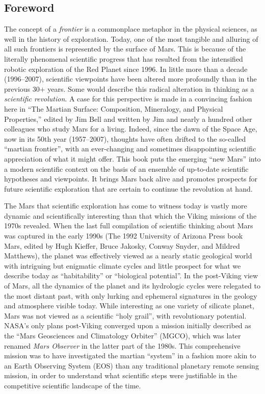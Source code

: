 \begin{foreword}
\chapter*{Foreword}

The concept of a {\it frontier} is a commonplace metaphor in the physical sciences, as well in the history of exploration. Today, one of the most tangible and alluring of all such frontiers is represented by the surface of Mars. This is because of the literally phenomenal scientific progress that has resulted from the intensified robotic exploration of the Red Planet since 1996. In little more than a decade (1996--2007), scientific viewpoints have been altered more profoundly than in the previous 30$+$ years. Some would describe this radical alteration in thinking as a {\it scientific revolution}. A case for this perspective is made in a convincing fashion here in ``The Martian Surface: Composition, Mineralogy, and Physical Properties,'' edited by Jim Bell and written by Jim and nearly a hundred other colleagues who study Mars for a living. Indeed, since the dawn of the Space Age, now in its 50th year (1957--2007), thoughts have often drifted to the so-called ``martian frontier'', with an ever-changing and sometimes disappointing scientific appreciation of what it might offer. This book puts the emerging ``new Mars'' into a modern scientific context on the basis of an ensemble of up-to-date scientific hypotheses and viewpoints. It brings Mars back alive and promotes prospects for future scientific exploration that are certain to continue the revolution at hand.

The Mars that scientific exploration has come to witness today is vastly more dynamic and scientifically interesting than that which the Viking missions of the 1970s revealed. When the last full compilation of scientific thinking about Mars was captured in the early 1990s (The 1992 University of Arizona Press book Mars, edited by Hugh Kieffer, Bruce Jakosky, Conway Snyder, and Mildred Matthews), the planet was effectively viewed as a nearly static geological world with intriguing but enigmatic climate cycles and little prospect for what we describe today as ``habitability'' or ``biological potential''. In the post-Viking view of Mars, all the dynamics of the planet and its hydrologic cycles were relegated to the most distant past, with only lurking and ephemeral signatures in the geology and atmosphere visible today. While interesting as one variety of silicate planet, Mars was not viewed as a scientific ``holy grail'', with revolutionary potential. NASA's only plans post-Viking converged upon a mission initially described as the ``Mars Geosciences and Climatology Orbiter'' (MGCO), which was later renamed {\it Mars Observer} in the latter part of the 1980s. This comprehensive mission was to have investigated the martian ``system'' in a fashion more akin to an Earth Observing System (EOS) than any traditional planetary remote sensing mission, in order to understand what scientific steps were justifiable in the competitive scientific landscape of the time.


\end{foreword}
